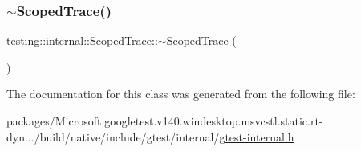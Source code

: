 \mbox{\label{classtesting_1_1internal_1_1_scoped_trace_a658c7c098ff48337058bfa2ccab65881}} 
\subsubsection{\texorpdfstring{$\sim$ScopedTrace()}{~ScopedTrace()}}
{\footnotesize\ttfamily testing\+::internal\+::\+Scoped\+Trace\+::$\sim$\+Scoped\+Trace (\begin{DoxyParamCaption}{ }\end{DoxyParamCaption})}



The documentation for this class was generated from the following file\+:\begin{DoxyCompactItemize}
\item 
packages/\+Microsoft.\+googletest.\+v140.\+windesktop.\+msvcstl.\+static.\+rt-\/dyn.../build/native/include/gtest/internal/\mbox{\hyperlink{gtest-internal_8h}{gtest-\/internal.\+h}}\end{DoxyCompactItemize}
